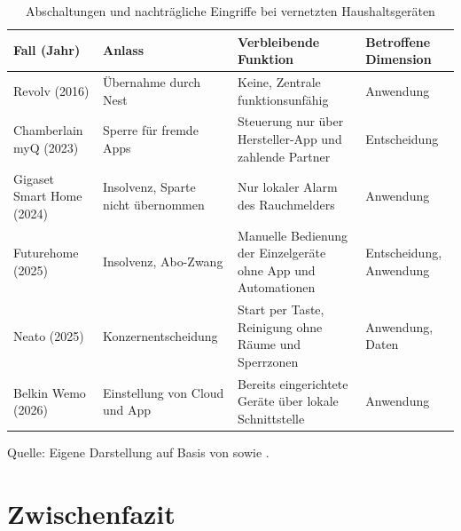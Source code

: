 \begin{table}[htbp]
  \centering
  \caption{Abschaltungen und nachträgliche Eingriffe bei vernetzten Haushaltsgeräten}
  \label{tab:cloud-faelle}
  \footnotesize
  \setlength{\tabcolsep}{4pt}
  \renewcommand{\arraystretch}{1.25}
  \begin{tabularx}{\textwidth}{@{}>{\raggedright\arraybackslash}p{2.7cm}
      >{\raggedright\arraybackslash}p{3.3cm}
      >{\raggedright\arraybackslash}X
      >{\raggedright\arraybackslash}p{2.9cm}@{}}
    \toprule
    \textbf{Fall (Jahr)} & \textbf{Anlass} & \textbf{Verbleibende Funktion}
      & \textbf{Betroffene Dimension} \\
    \midrule
    Revolv (2016) & Übernahme durch Nest
      & Keine, Zentrale funktionsunfähig & Anwendung \\
    Chamberlain myQ (2023) & Sperre für fremde Apps
      & Steuerung nur über Hersteller-App und zahlende Partner
      & Entscheidung \\
    Gigaset Smart Home (2024) & Insolvenz, Sparte nicht übernommen
      & Nur lokaler Alarm des Rauchmelders & Anwendung \\
    Futurehome (2025) & Insolvenz, Abo-Zwang
      & Manuelle Bedienung der Einzelgeräte ohne App und Automationen
      & Entscheidung, Anwendung \\
    Neato (2025) & Konzernentscheidung
      & Start per Taste, Reinigung ohne Räume und Sperrzonen
      & Anwendung, Daten \\
    Belkin Wemo (2026) & Einstellung von Cloud und App
      & Bereits eingerichtete Geräte über lokale Schnittstelle
      & Anwendung \\
    \bottomrule
  \end{tabularx}
  \par\smallskip
  \raggedright\scriptsize
  Quelle: Eigene Darstellung auf Basis von
  \cite[S.~811\,f.]{hoofnagle:2019} sowie
  \cite{homeassistant:2023,gigaset:2024a,schoutsen:2025,heise:2025neato}.
\end{table}

\section{Zwischenfazit}\label{sec:cloud-zwischenfazit}

